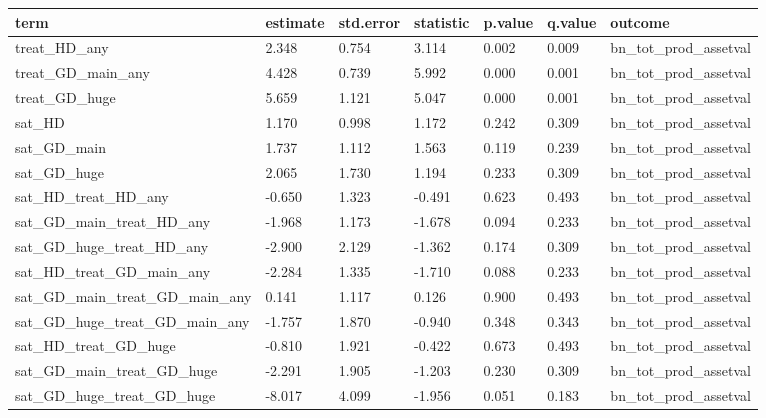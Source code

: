 \begin{tabular}{lllllll}
\toprule
term & estimate & std.error & statistic & p.value & q.value & outcome
 \\
\midrule
treat\_HD\_any & 2.348 & 0.754 & 3.114 & 0.002 & 0.009 & bn\_tot\_prod\_assetval \\
treat\_GD\_main\_any & 4.428 & 0.739 & 5.992 & 0.000 & 0.001 & bn\_tot\_prod\_assetval \\
treat\_GD\_huge & 5.659 & 1.121 & 5.047 & 0.000 & 0.001 & bn\_tot\_prod\_assetval \\
sat\_HD & 1.170 & 0.998 & 1.172 & 0.242 & 0.309 & bn\_tot\_prod\_assetval \\
sat\_GD\_main & 1.737 & 1.112 & 1.563 & 0.119 & 0.239 & bn\_tot\_prod\_assetval \\
sat\_GD\_huge & 2.065 & 1.730 & 1.194 & 0.233 & 0.309 & bn\_tot\_prod\_assetval \\
sat\_HD\_treat\_HD\_any & -0.650 & 1.323 & -0.491 & 0.623 & 0.493 & bn\_tot\_prod\_assetval \\
sat\_GD\_main\_treat\_HD\_any & -1.968 & 1.173 & -1.678 & 0.094 & 0.233 & bn\_tot\_prod\_assetval \\
sat\_GD\_huge\_treat\_HD\_any & -2.900 & 2.129 & -1.362 & 0.174 & 0.309 & bn\_tot\_prod\_assetval \\
sat\_HD\_treat\_GD\_main\_any & -2.284 & 1.335 & -1.710 & 0.088 & 0.233 & bn\_tot\_prod\_assetval \\
sat\_GD\_main\_treat\_GD\_main\_any & 0.141 & 1.117 & 0.126 & 0.900 & 0.493 & bn\_tot\_prod\_assetval \\
sat\_GD\_huge\_treat\_GD\_main\_any & -1.757 & 1.870 & -0.940 & 0.348 & 0.343 & bn\_tot\_prod\_assetval \\
sat\_HD\_treat\_GD\_huge & -0.810 & 1.921 & -0.422 & 0.673 & 0.493 & bn\_tot\_prod\_assetval \\
sat\_GD\_main\_treat\_GD\_huge & -2.291 & 1.905 & -1.203 & 0.230 & 0.309 & bn\_tot\_prod\_assetval \\
sat\_GD\_huge\_treat\_GD\_huge & -8.017 & 4.099 & -1.956 & 0.051 & 0.183 & bn\_tot\_prod\_assetval \\
\bottomrule
\end{tabular}
